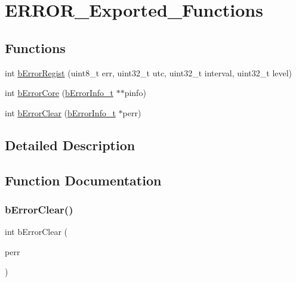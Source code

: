 \hypertarget{group___e_r_r_o_r___exported___functions}{}\section{E\+R\+R\+O\+R\+\_\+\+Exported\+\_\+\+Functions}
\label{group___e_r_r_o_r___exported___functions}
\subsection*{Functions}
\begin{DoxyCompactItemize}
\item 
int \mbox{\hyperlink{group___e_r_r_o_r___exported___functions_gaa81ea8013f96b93c7c6478ec2b141540}{b\+Error\+Regist}} (uint8\+\_\+t err, uint32\+\_\+t utc, uint32\+\_\+t interval, uint32\+\_\+t level)
\item 
int \mbox{\hyperlink{group___e_r_r_o_r___exported___functions_ga7676c125c77242eef64c97c03a468713}{b\+Error\+Core}} (\mbox{\hyperlink{structb_error_info__t}{b\+Error\+Info\+\_\+t}} $\ast$$\ast$pinfo)
\item 
int \mbox{\hyperlink{group___e_r_r_o_r___exported___functions_gae76cb04af80bae754486b0a593cf62a6}{b\+Error\+Clear}} (\mbox{\hyperlink{structb_error_info__t}{b\+Error\+Info\+\_\+t}} $\ast$perr)
\end{DoxyCompactItemize}


\subsection{Detailed Description}


\subsection{Function Documentation}
\mbox{\label{group___e_r_r_o_r___exported___functions_gae76cb04af80bae754486b0a593cf62a6}} 
\subsubsection{\texorpdfstring{b\+Error\+Clear()}{bErrorClear()}}
{\footnotesize\ttfamily int b\+Error\+Clear (\begin{DoxyParamCaption}\item[{\mbox{\hyperlink{structb_error_info__t}{b\+Error\+Info\+\_\+t}} $\ast$}]{perr }\end{DoxyParamCaption})}

